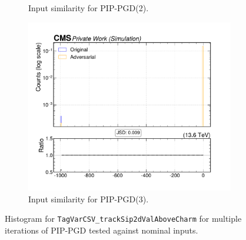 \begin{figure}[htbp]
\begin{subfigure}[t]{0.32\textwidth}
    \caption*{Input similarity for PIP-PGD(2).}
  \end{subfigure}\hfill
  \begin{subfigure}[t]{0.32\textwidth}
    \includegraphics[width=\linewidth]{media/output/features/compare/combined_it_3/cmp_global_features_TagVarCSV_trackSip2dValAboveCharm.pdf}
    \caption*{Input similarity for PIP-PGD(3).}
  \end{subfigure}

  \caption*{Histogram for \texttt{TagVarCSV\_trackSip2dValAboveCharm} for multiple iterations of PIP-PGD tested against nominal inputs.}
  \label{fig:combined_input_TagVarCSV_trackSip2dValAboveCharm}
\end{figure}


